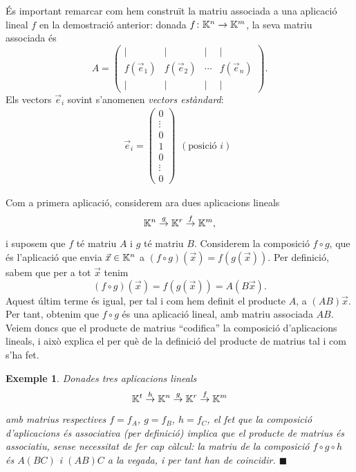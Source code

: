 \documentclass[
  11pt,
]{book}
\numberwithin{dummy}{section}
\theoremstyle{maincolornumbox}
\theoremstyle{blacknumex}
\newtheorem{exampleT}{Exemple}[chapter]
\theoremstyle{blacknumbox}
\theoremstyle{maincolornum}
\newenvironment{example}{\begin{exampleT}}{\hfill{\tiny\ensuremath{\blacksquare}}\end{exampleT}}
\newlength\esp
\begin{document}
És important remarcar com hem construït la matriu associada a una
aplicació lineal \(f\) en la demostració anterior: donada
\(f\colon \mathbb{K}^n\rightarrow \mathbb{K}^m\), la seva matriu associada és
\[A=\begin{pmatrix}
\mid & \mid &\mid & \mid\\
f(\vec e_1) & f(\vec e_2) &\cdots&f(\vec e_n)\\
\mid & \mid &\mid & \mid
\end{pmatrix}.\] Els vectors \(\vec e_i\) sovint s'anomenen \emph{vectors
estàndard}: \[\vec e_i = \begin{pmatrix}
0\\\vdots\\0\\1\\0\\\vdots\\0
\end{pmatrix}
\begin{matrix}
\phantom{0}\\\phantom{\vdots}\\\phantom{0}\\(\textrm{posició } i)\\\phantom{0}\\\phantom{\vdots}\\\phantom{0}
\end{matrix}\]

Com a primera aplicació, considerem ara dues aplicacions lineals
\[\mathbb{K}^n \stackrel{g}{\rightarrow} \mathbb{K}^r \stackrel{f}{\rightarrow} \mathbb{K}^m,\]
i suposem que \(f\) té matriu \(A\) i \(g\) té matriu \(B\). Considerem la
composició \(f\circ g\), que és l'aplicació que envia \(\vec x\in \mathbb{K}^n\) a
\((f\circ g)(\vec x) = f(g(\vec x))\). Per definició, sabem que per a tot
\(\vec x\) tenim
\[(f\circ g)(\vec x) = f(g(\vec x)) = A(B\vec x).\]
Aquest últim terme és igual, per tal i com hem definit el producte \(A\), a \((AB)\vec x\). Per
tant, obtenim que \(f\circ g\) és una aplicació lineal, amb matriu
associada \(AB\). Veiem doncs que el producte de matrius ``codifica'' la
composició d'aplicacions lineals, i això explica el per què de la definició del producte de matrius tal i com s'ha fet.

\begin{example}
Donades tres aplicacions lineals
\[\mathbb{K}^t\stackrel{h}{\rightarrow}\mathbb{K}^n \stackrel{g}{\rightarrow} \mathbb{K}^r \stackrel{f}{\rightarrow} \mathbb{K}^m\]
amb matrius respectives \(f=f_A\), \(g=f_B\), \(h=f_C\), el fet que la
composició d'aplicacions és associativa (per definició) implica que el
producte de matrius és associatiu, sense necessitat de fer cap càlcul:
la matriu de la composició \(f\circ g \circ h\) és \(A(BC)\) i \((AB)C\) a la
vegada, i per tant han de coincidir.
\end{example}
\end{document}
